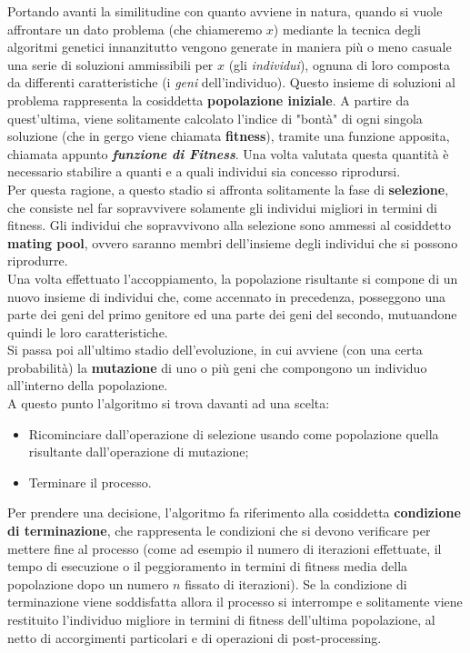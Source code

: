     Portando avanti la similitudine con quanto avviene in natura, quando si vuole affrontare un dato problema (che chiameremo $x$) mediante la tecnica degli algoritmi genetici innanzitutto vengono generate in maniera più o meno casuale una serie di soluzioni ammissibili per $x$ (gli \textit{individui}), ognuna di loro composta da differenti caratteristiche (i \textit{geni} dell'individuo). Questo insieme di soluzioni al problema rappresenta la cosiddetta \textbf{popolazione iniziale}. A partire da quest'ultima, viene solitamente calcolato l'indice di "bontà" di ogni singola soluzione (che in gergo viene chiamata \textbf{fitness}), tramite una funzione apposita, chiamata appunto \textbf{\textit{funzione di Fitness}}. Una volta valutata questa quantità è necessario stabilire a quanti e a quali individui sia concesso riprodursi. \\
    Per questa ragione, a questo stadio si affronta solitamente la fase di \textbf{selezione}, che consiste nel far sopravvivere solamente gli individui migliori in termini di fitness. Gli individui che sopravvivono alla selezione sono ammessi al cosiddetto \textbf{mating pool}, ovvero saranno membri dell'insieme degli individui che si possono riprodurre. \\
    Una volta effettuato l'accoppiamento, la popolazione risultante si compone di un nuovo insieme di individui che, come accennato in precedenza, posseggono una parte dei geni del primo genitore ed una parte dei geni del secondo, mutuandone quindi le loro caratteristiche. \\
    Si passa poi all'ultimo stadio dell'evoluzione, in cui avviene (con una certa probabilità) la \textbf{mutazione} di uno o più geni che compongono un individuo all'interno della popolazione. \\
    A questo punto l'algoritmo si trova davanti ad una scelta: 
    \begin{itemize}
        \item Ricominciare dall'operazione di selezione usando come popolazione quella risultante dall'operazione di mutazione;
        \item Terminare il processo.
    \end{itemize}

    Per prendere una decisione, l'algoritmo fa riferimento alla cosiddetta \textbf{condizione di terminazione}, che rappresenta le condizioni che si devono verificare per mettere fine al processo (come ad esempio il numero di iterazioni effettuate, il tempo di esecuzione o il peggioramento in termini di fitness media della popolazione dopo un numero $n$ fissato di iterazioni). Se la condizione di terminazione viene soddisfatta allora il processo si interrompe e solitamente viene restituito l'individuo migliore in termini di fitness dell'ultima popolazione, al netto di accorgimenti particolari e di operazioni di post-processing.

